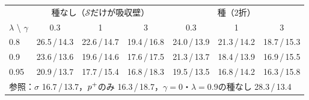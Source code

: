 \begin{tabular}{lccc|ccc}
\toprule
 & \multicolumn{3}{c|}{種なし（$\mathcal{S}$だけが吸収壁）} & \multicolumn{3}{c}{種（2折）}\\
$\lambda$ \textbackslash{} $\gamma$ & 0.3 & 1 & 3 & 0.3 & 1 & 3\\
\midrule
0.8 & 26.5\,/\,14.3 & 22.6\,/\,14.7 & 19.4\,/\,16.8 & 24.0\,/\,13.9 & 21.3\,/\,14.2 & 18.7\,/\,15.3\\
0.9 & 23.6\,/\,13.6 & 19.6\,/\,14.6 & 17.6\,/\,17.5 & 21.3\,/\,13.7 & 18.4\,/\,13.9 & 16.9\,/\,15.5\\
0.95 & 20.9\,/\,13.7 & 17.7\,/\,15.4 & 16.8\,/\,18.3 & 19.5\,/\,13.5 & 16.8\,/\,14.2 & 16.3\,/\,15.8\\
\midrule
\multicolumn{7}{l}{参照：$\sigma$ 16.7\,/\,13.7，$p^{+}$のみ 16.3\,/\,18.7，$\gamma{=}0$・$\lambda{=}0.9$の種なし 28.3\,/\,13.4}\\
\bottomrule
\end{tabular}
